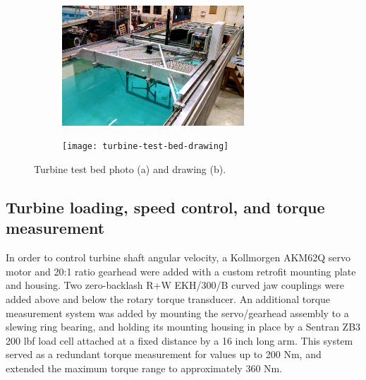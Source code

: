 \begin{figure}[ht]
    \centering
    \begin{subfigure}[t]{\textwidth}
        \centering
        
        \includegraphics[width=0.75\textwidth]{figures/turbine-test-bed-photo}
        
        \caption{} 
        
        \label{fig:turbine-test-bed-photo}
    \end{subfigure}
    
    \begin{subfigure}[t]{\textwidth}
        \centering
        
        \texttt{[image: turbine-test-bed-drawing]}
        
        \caption{}
        
        \label{fig:turbine-test-bed-drawing}
    \end{subfigure}
    
    \caption{Turbine test bed photo (a) and drawing (b).}
    
    \label{fig:turbine-test-bed}
\end{figure}


\subsection{Turbine loading, speed control, and torque measurement}

In order to control turbine shaft angular velocity, a Kollmorgen AKM62Q servo
motor and 20:1 ratio gearhead were added with a custom retrofit mounting plate
and housing. Two zero-backlash R+W EKH/300/B curved jaw couplings were added
above and below the rotary torque transducer. An additional torque measurement
system was added by mounting the servo/gearhead assembly to a slewing ring
bearing, and holding its mounting housing in place by a Sentran ZB3 200 lbf load
cell attached at a fixed distance by a 16 inch long arm. This system served as a
redundant torque measurement for values up to 200 Nm, and extended the maximum
torque range to approximately 360 Nm.

